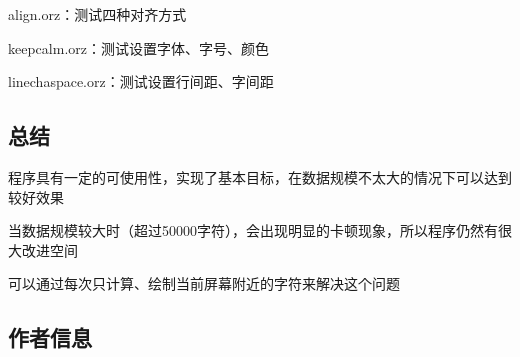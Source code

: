 \begin{DoxyEnumerate}
\item {\ttfamily align.\+orz}：测试四种对齐方式
\item {\ttfamily keepcalm.\+orz}：测试设置字体、字号、颜色
\item {\ttfamily linechaspace.\+orz}：测试设置行间距、字间距
\end{DoxyEnumerate}

\subsection*{总结 }


\begin{DoxyEnumerate}
\item 程序具有一定的可使用性，实现了基本目标，在数据规模不太大的情况下可以达到较好效果
\item 当数据规模较大时（超过50000字符），会出现明显的卡顿现象，所以程序仍然有很大改进空间~\newline

\begin{DoxyItemize}
\item 可以通过每次只计算、绘制当前屏幕附近的字符来解决这个问题
\end{DoxyItemize}
\end{DoxyEnumerate}

\subsection*{作者信息 }


